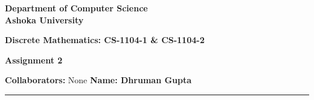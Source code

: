 \documentclass[a4paper]{article}
\begin{document}
\begin{center}
{\large \bf \color{red}  Department of Computer Science} \\
{\large \bf \color{red}  Ashoka University} \\

\vspace{0.1in}

{\large \bf \color{blue}  Discrete Mathematics: CS-1104-1 \& CS-1104-2}

\vspace{0.05in}

    { \bf \color{YellowOrange} Assignment 2}
\end{center}
\medskip

{\textbf{Collaborators:} None} \hfill {\textbf{Name: Dhruman Gupta} }

\bigskip
\hrule


\end{document}
